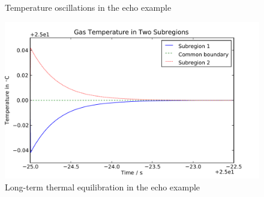 \begin{figure}[htbp]
  \quad
  \caption{Temperature oscillations in the echo example}
  \label{fig:EchoTemperature}
\end{figure}

\begin{figure}[htbp]
  \includegraphics[width=\linewidth]{Results/Basic/Echo/1/Temperature}%
  \caption{Long-term thermal equilibration in the echo example}
  \label{fig:EchoTemperatureLong}
\end{figure}

